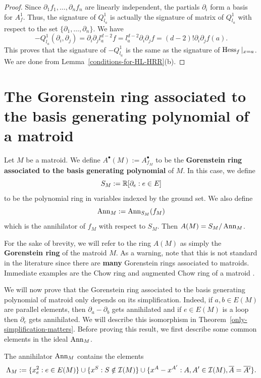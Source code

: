 \documentclass{puthesis-UG}
\begin{document}
\begin{proof}
	Since $\partial_1 f_1, \ldots, \partial_n f_n$ are linearly independent, the partials $\partial_i$ form a basis for $A_f^1$. Thus, the signature of $Q_{l_a}^1$ is actually the signature of matrix of $Q_{l_a}^1$ with respect to the set $\{\partial_1, \ldots, \partial_n\}.$ We have 
	\[
		-Q_{l_a}^1(\partial_i, \partial_j) = \partial_i \partial_j l_a^{d-2} f =  l_a^{d-2} \partial_i \partial_j f = (d-2)! \partial_i \partial_j f(a).
	\]
	This proves that the signature of $-Q^1_{l_a}$ is the same as the signature of $\operatorname{Hess}_f |_{x = a}$.  We are done from Lemma~\ref{conditions-for-HL-HRR}(b).
\end{proof}
\section{The Gorenstein ring associated to the basis generating polynomial of a matroid}

\begin{defn}
	Let $M$ be a matroid. We define $A^\bullet(M) := A^\bullet_{f_M}$ to be the \textbf{Gorenstein ring associated to the basis generating polynomial} of $M$. In this case, we define 
	\[
		S_M := \mathbb{R} [ \partial_e : e \in E]
	\]
	to be the polynomial ring in variables indexed by the ground set. We also define
	\[
		\operatorname{Ann}_M := \operatorname{Ann}_{S_M}(f_M)
	\]
	which is the annihilator of $f_M$ with respect to $S_M$. Then $A(M) = S_M / \operatorname{Ann}_M$. 
\end{defn}

\begin{remark}
	For the sake of brevity, we will refer to the ring $A(M)$ as simply the \textbf{Gorenstein ring} of the matroid $M$. As a warning, note that this is not standard in the literature since there are \textbf{many} Gorenstein rings associated to matroids. Immediate examples are the Chow ring and augmented Chow ring of a matroid \cite{huh-semi-small}. 
\end{remark}

We will now prove that the Gorenstein ring associated to the basis generating polynomial of matroid only depends on its simplification. Indeed, if $a, b \in E(M)$ are parallel elements, then $\partial_a - \partial_b$ gets annihilated and if $e \in E(M)$ is a loop then $\partial_e$ gets annihilated. We will describe this isomorphism in Theorem~\ref{only-simplification-matters}. Before proving this result, we first describe some common elements in the ideal $\operatorname{Ann}_M$. 

\begin{prop}
	The annihilator $\operatorname{Ann}_M$ contains the elements
	\[
		\Lambda_M := \{x_e^2 : e \in E(M)\} \cup \{x^S : S \notin \mathcal{I} (M)\} \cup \{x^A - x^{A'} : A, A' \in \mathcal{I}(M), \overline{A} = \overline{A'}\}.
	\]
\end{prop}
\end{document}
